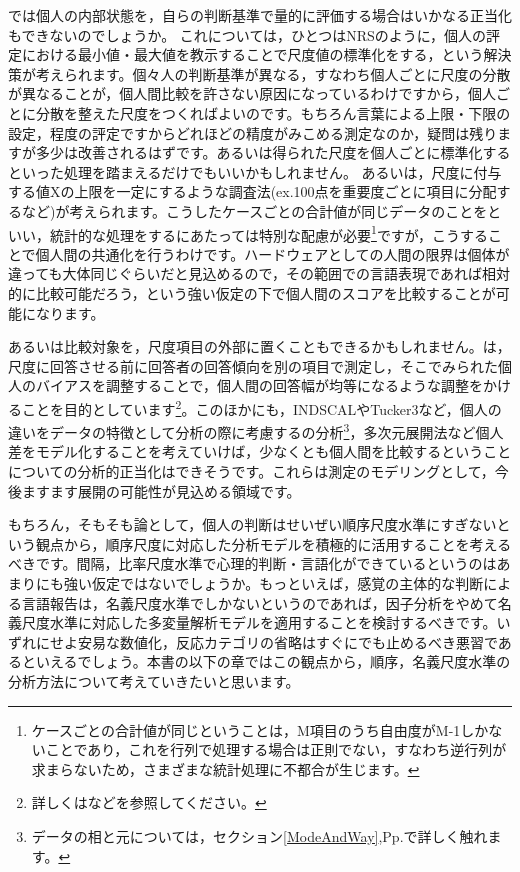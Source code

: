 \documentclass{ltjsbook}
\begin{document}
では個人の内部状態を，自らの判断基準で量的に評価する場合はいかなる正当化もできないのでしょうか。
これについては，ひとつはNRSのように，個人の評定における最小値・最大値を教示することで尺度値の標準化をする，という解決策が考えられます。個々人の判断基準が異なる，すなわち個人ごとに尺度の分散が異なることが，個人間比較を許さない原因になっているわけですから，個人ごとに分散を整えた尺度をつくればよいのです。もちろん言葉による上限・下限の設定，程度の評定ですからどれほどの精度がみこめる測定なのか，疑問は残りますが多少は改善されるはずです。あるいは得られた尺度を個人ごとに標準化するといった処理を踏まえるだけでもいいかもしれません。
あるいは，尺度に付与する値Xの上限を一定にするような調査法(ex.100点を重要度ごとに項目に分配するなど)が考えられます。こうしたケースごとの合計値が同じデータのことをといい，統計的な処理をするにあたっては特別な配慮が必要\footnote{ケースごとの合計値が同じということは，M項目のうち自由度がM-1しかないことであり，これを行列で処理する場合は正則でない，すなわち逆行列が求まらないため，さまざまな統計処理に不都合が生じます。}ですが，こうすることで個人間の共通化を行うわけです。ハードウェアとしての人間の限界は個体が違っても大体同じぐらいだと見込めるので，その範囲での言語表現であれば相対的に比較可能だろう，という強い仮定の下で個人間のスコアを比較することが可能になります。

あるいは比較対象を，尺度項目の外部に置くこともできるかもしれません。は，尺度に回答させる前に回答者の回答傾向を別の項目で測定し，そこでみられた個人のバイアスを調整することで，個人間の回答幅が均等になるような調整をかけることを目的としています\footnote{詳しくは\textcite{Hojodaiki2018}などを参照してください。}。このほかにも，INDSCALやTucker3など，個人の違いをデータの特徴として分析の際に考慮するの分析\footnote{データの相と元については，セクション\ref{ModeAndWay},Pp.\pageref{ModeAndWay}で詳しく触れます。}，多次元展開法など個人差をモデル化することを考えていけば，少なくとも個人間を比較するということについての分析的正当化はできそうです。これらは測定のモデリングとして，今後ますます展開の可能性が見込める領域です。

もちろん，そもそも論として，個人の判断はせいぜい順序尺度水準にすぎないという観点から，順序尺度に対応した分析モデルを積極的に活用することを考えるべきです。間隔，比率尺度水準で心理的判断・言語化ができているというのはあまりにも強い仮定ではないでしょうか。もっといえば，感覚の主体的な判断による言語報告は，名義尺度水準でしかないというのであれば，因子分析をやめて名義尺度水準に対応した多変量解析モデルを適用することを検討するべきです。いずれにせよ安易な数値化，反応カテゴリの省略はすぐにでも止めるべき悪習であるといえるでしょう。本書の以下の章ではこの観点から，順序，名義尺度水準の分析方法について考えていきたいと思います。
\end{document}
